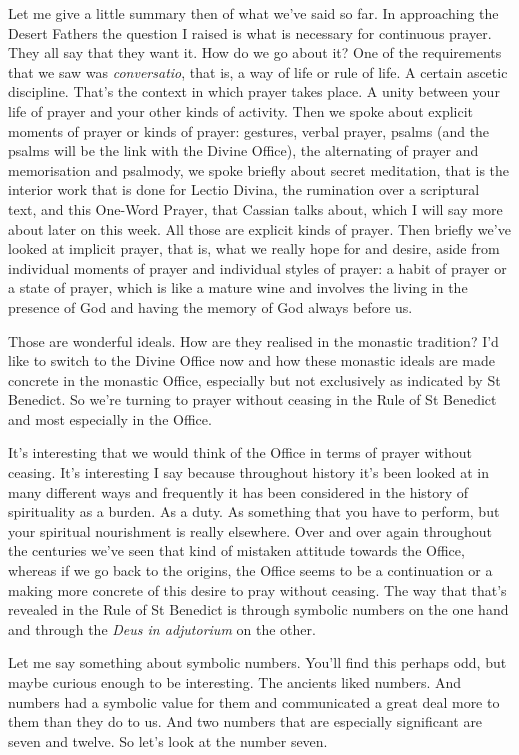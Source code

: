 Let me give a little summary then of what we've said so far. In approaching the Desert Fathers the question I raised is what is necessary for continuous prayer. They all say that they want it. How do we go about it? One of the requirements that we saw was \emph{conversatio}, that is, a way of life or rule of life. A certain ascetic discipline. That's the context in which prayer takes place. A unity between your life of prayer and your other kinds of activity. Then we spoke about explicit moments of prayer or kinds of prayer: gestures, verbal prayer, psalms (and the psalms will be the link with the Divine Office), the alternating of prayer and memorisation and psalmody, we spoke briefly about secret meditation, that is the interior work that is done for Lectio Divina, the rumination over a scriptural text, and this One-Word Prayer, that Cassian talks about, which I will say more about later on this week. All those are explicit kinds of prayer. Then briefly we've looked at implicit prayer, that is, what we really hope for and desire, aside from individual moments of prayer and individual styles of prayer: a habit of prayer or a state of prayer, which is like a mature wine and involves the living in the presence of God and having the memory of God always before us.

Those are wonderful ideals. How are they realised in the monastic tradition? I'd like to switch to the Divine Office now and how these monastic ideals are made concrete in the monastic Office, especially but not exclusively as indicated by St Benedict. So we're turning to prayer without ceasing in the Rule of St Benedict and most especially in the Office.

It's interesting that we would think of the Office in terms of prayer without ceasing. It's interesting I say because throughout history it's been looked at in many different ways and frequently it has been considered in the history of spirituality as a burden. As a duty. As something that you have to perform, but your spiritual nourishment is really elsewhere. Over and over again throughout the centuries we've seen that kind of mistaken attitude towards the Office, whereas if we go back to the origins, the Office seems to be a continuation or a making more concrete of this desire to pray without ceasing. The way that that's revealed in the Rule of St Benedict is through symbolic numbers on the one hand and through the \emph{Deus in adjutorium} on the other.

Let me say something about symbolic numbers. You'll find this perhaps odd, but maybe curious enough to be interesting. The ancients liked numbers. And numbers had a symbolic value for them and communicated a great deal more to them than they do to us. And two numbers that are especially significant are seven and twelve. So let's look at the number seven.

